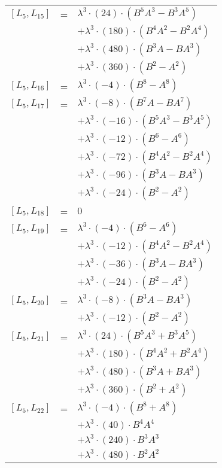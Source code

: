 \documentclass{article}
\begin{document}
\begin{center}
\begin{longtable}{lll}
$[L_{5},L_{15}]$ & = & ${\lambda}^3{\cdot}(24){\cdot}(B^{5}A^{3}-B^{3}A^{5})$ \\*
 & & $ + {\lambda}^3{\cdot}(180){\cdot}(B^{4}A^{2}-B^{2}A^{4})$ \\*
 & & $ + {\lambda}^3{\cdot}(480){\cdot}(B^{3}A-BA^{3})$ \\*
 & & $ + {\lambda}^3{\cdot}(360){\cdot}(B^{2}-A^{2})$ \\
$[L_{5},L_{16}]$ & = & ${\lambda}^3{\cdot}(-4){\cdot}(B^{8}-A^{8})$ \\
$[L_{5},L_{17}]$ & = & ${\lambda}^3{\cdot}(-8){\cdot}(B^{7}A-BA^{7})$ \\*
 & & $ + {\lambda}^3{\cdot}(-16){\cdot}(B^{5}A^{3}-B^{3}A^{5})$ \\*
 & & $ + {\lambda}^3{\cdot}(-12){\cdot}(B^{6}-A^{6})$ \\*
 & & $ + {\lambda}^3{\cdot}(-72){\cdot}(B^{4}A^{2}-B^{2}A^{4})$ \\*
 & & $ + {\lambda}^3{\cdot}(-96){\cdot}(B^{3}A-BA^{3})$ \\*
 & & $ + {\lambda}^3{\cdot}(-24){\cdot}(B^{2}-A^{2})$ \\
$[L_{5},L_{18}]$ & = & $ 0 $ \\
$[L_{5},L_{19}]$ & = & ${\lambda}^3{\cdot}(-4){\cdot}(B^{6}-A^{6})$ \\*
 & & $ + {\lambda}^3{\cdot}(-12){\cdot}(B^{4}A^{2}-B^{2}A^{4})$ \\*
 & & $ + {\lambda}^3{\cdot}(-36){\cdot}(B^{3}A-BA^{3})$ \\*
 & & $ + {\lambda}^3{\cdot}(-24){\cdot}(B^{2}-A^{2})$ \\
$[L_{5},L_{20}]$ & = & ${\lambda}^3{\cdot}(-8){\cdot}(B^{3}A-BA^{3})$ \\*
 & & $ + {\lambda}^3{\cdot}(-12){\cdot}(B^{2}-A^{2})$ \\
$[L_{5},L_{21}]$ & = & ${\lambda}^3{\cdot}(24){\cdot}(B^{5}A^{3}+B^{3}A^{5})$ \\*
 & & $ + {\lambda}^3{\cdot}(180){\cdot}(B^{4}A^{2}+B^{2}A^{4})$ \\*
 & & $ + {\lambda}^3{\cdot}(480){\cdot}(B^{3}A+BA^{3})$ \\*
 & & $ + {\lambda}^3{\cdot}(360){\cdot}(B^{2}+A^{2})$ \\
$[L_{5},L_{22}]$ & = & ${\lambda}^3{\cdot}(-4){\cdot}(B^{8}+A^{8})$ \\*
 & & $ + {\lambda}^3{\cdot}(40){\cdot}B^{4}A^{4}$ \\*
 & & $ + {\lambda}^3{\cdot}(240){\cdot}B^{3}A^{3}$ \\*
 & & $ + {\lambda}^3{\cdot}(480){\cdot}B^{2}A^{2}$ \\*

\end{longtable}
\end{center}
\end{document}
